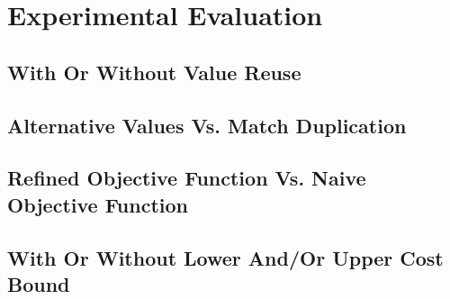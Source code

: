 %

\chapter{Experimental Evaluation}

\section{With Or Without Value Reuse}
\section{Alternative Values Vs. Match Duplication}
\section{Refined Objective Function Vs. Naive Objective Function}
\section{With Or Without Lower And/Or Upper Cost Bound}
